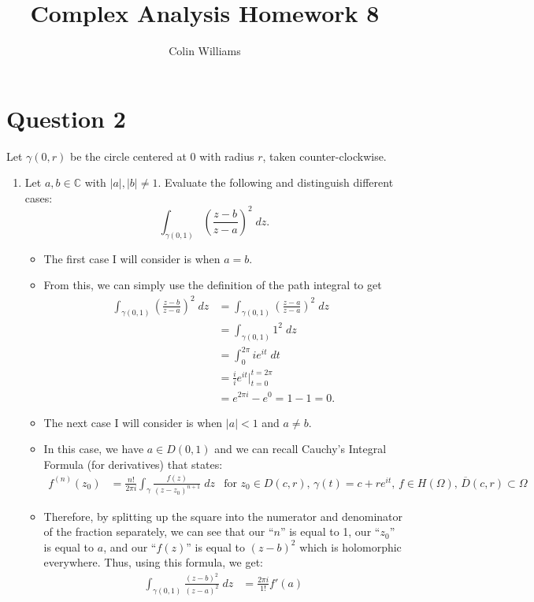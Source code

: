 \documentclass[10pt,a4paper]{article}
\title{Complex Analysis Homework 8}
\author{Colin Williams}
\theoremstyle{definition}
\begin{document}
\maketitle

\section*{Question 2}
Let $\gamma(0,r)$ be the circle centered at 0 with radius $r$, taken counter-clockwise.
\begin{enumerate}[label = (\alph*)]
\item Let $a,b \in \mathbb{C}$ with $|a|, |b| \neq 1$. Evaluate the following and distinguish different cases:
\[\int_{\gamma(0,1)} \left(\frac{z - b}{z - a}\right)^2 \; dz.\]
	\begin{itemize}
	\item The first case I will consider is when $a = b$.
	\item From this, we can simply use the definition of the path integral to get
	\begin{align*}
	\int_{\gamma(0,1)}\left(\frac{z - b}{z - a}\right)^2 \; dz &= \int_{\gamma(0,1)}\left(\frac{z - a}{z - a}\right)^2 \; dz\\
	&= \int_{\gamma(0,1)} 1^2 \; dz\\
	&= \int_0^{2\pi} ie^{it} \; dt\\
	&= \frac{i}{i} e^{it} \bigg|_{t =0}^{t = 2\pi}\\
	&= e^{2\pi i} - e^0 = 1-1  = 0.
	\end{align*}
	\item The next case I will consider is when $|a| < 1$ and $a \neq b$.
	\item In this case, we have $a \in D(0,1)$ and we can recall Cauchy's Integral Formula (for derivatives) that states:
	\begin{align*}
	f^{(n)}(z_0) &= \frac{n!}{2\pi i} \int_{\gamma} \frac{f(z)}{(z - z_0)^{n+1}} \; dz &\text{for $z_0 \in D(c, r)$, $\gamma(t) = c + re^{it}$, $f \in H(\Omega)$, $\overline{D}(c, r) \subset \Omega$}
	\end{align*}
	\item Therefore, by splitting up the square into the numerator and denominator of the fraction separately, we can see that our \enquote{$n$} is equal to 1, our \enquote{$z_0$} is equal to $a$, and our \enquote{$f(z)$} is equal to $(z - b)^2$ which is holomorphic everywhere. Thus, using this formula, we get:
	\begin{align*}
	\int_{\gamma(0,1)} \frac{(z - b)^2}{(z - a)^2} \; dz &= \frac{2\pi i}{1!}f'(a)\\

\end{align*}
\end{itemize}
\end{enumerate}
\end{document}
